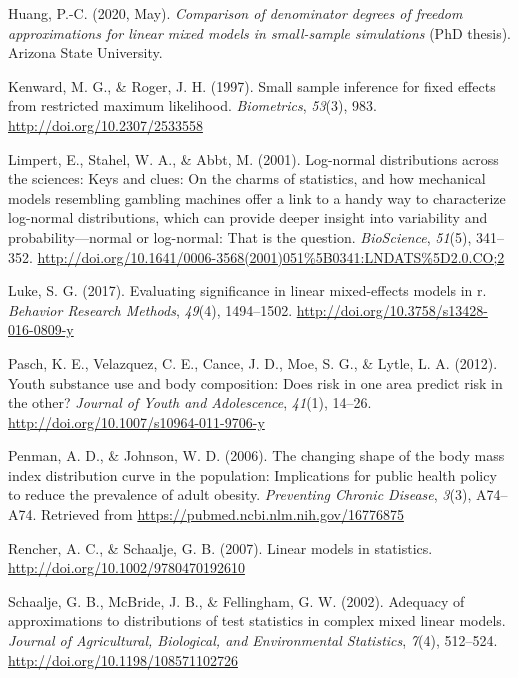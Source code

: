 \documentclass[12pt, twoside]{amherstthesis}
\begin{document}
\leavevmode\hypertarget{ref-huang_comparison_2020}{}%
Huang, P.-C. (2020, May). \emph{Comparison of denominator degrees of freedom approximations for linear mixed models in small-sample simulations} (PhD thesis). Arizona State University.

\leavevmode\hypertarget{ref-kenward-small-1997}{}%
Kenward, M. G., \& Roger, J. H. (1997). Small sample inference for fixed effects from restricted maximum likelihood. \emph{Biometrics}, \emph{53}(3), 983. \url{http://doi.org/10.2307/2533558}

\leavevmode\hypertarget{ref-limpert_log-normal_2001}{}%
Limpert, E., Stahel, W. A., \& Abbt, M. (2001). Log-normal distributions across the sciences: Keys and clues: On the charms of statistics, and how mechanical models resembling gambling machines offer a link to a handy way to characterize log-normal distributions, which can provide deeper insight into variability and probability---normal or log-normal: That is the question. \emph{BioScience}, \emph{51}(5), 341--352. \url{http://doi.org/10.1641/0006-3568(2001)051\%5B0341:LNDATS\%5D2.0.CO;2}

\leavevmode\hypertarget{ref-luke_evaluating_2017}{}%
Luke, S. G. (2017). Evaluating significance in linear mixed-effects models in r. \emph{Behavior Research Methods}, \emph{49}(4), 1494--1502. \url{http://doi.org/10.3758/s13428-016-0809-y}

\leavevmode\hypertarget{ref-pasch_youth_2012}{}%
Pasch, K. E., Velazquez, C. E., Cance, J. D., Moe, S. G., \& Lytle, L. A. (2012). Youth substance use and body composition: Does risk in one area predict risk in the other? \emph{Journal of Youth and Adolescence}, \emph{41}(1), 14--26. \url{http://doi.org/10.1007/s10964-011-9706-y}

\leavevmode\hypertarget{ref-penman_changing_2006}{}%
Penman, A. D., \& Johnson, W. D. (2006). The changing shape of the body mass index distribution curve in the population: Implications for public health policy to reduce the prevalence of adult obesity. \emph{Preventing Chronic Disease}, \emph{3}(3), A74--A74. Retrieved from \url{https://pubmed.ncbi.nlm.nih.gov/16776875}

\leavevmode\hypertarget{ref-rencher_schaalje_2007}{}%
Rencher, A. C., \& Schaalje, G. B. (2007). Linear models in statistics. \url{http://doi.org/10.1002/9780470192610}

\leavevmode\hypertarget{ref-schaalje_adequacy_2002}{}%
Schaalje, G. B., McBride, J. B., \& Fellingham, G. W. (2002). Adequacy of approximations to distributions of test statistics in complex mixed linear models. \emph{Journal of Agricultural, Biological, and Environmental Statistics}, \emph{7}(4), 512--524. \url{http://doi.org/10.1198/108571102726}
\end{document}
